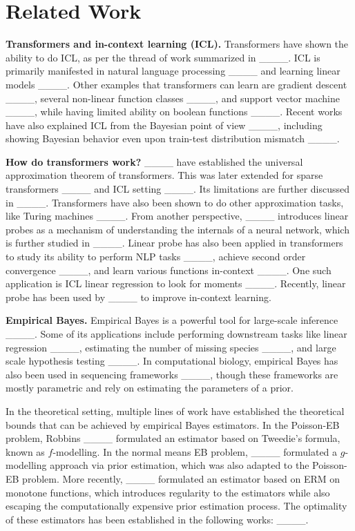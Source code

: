 \section{Related Work}
\textbf{Transformers and in-context learning (ICL). }
Transformers have shown the ability to do ICL, as per the thread of work summarized in 
____. 
ICL is primarily manifested in natural language processing ____ 
and learning linear models ____. 
Other examples that transformers can learn are gradient descent ____, 
several non-linear function classes ____, and support vector machine ____, 
while having limited ability on boolean functions ____. 
Recent works have also explained ICL from the Bayesian point of view 
____, including showing Bayesian behavior even upon train-test distribution mismatch ____. 


\textbf{How do transformers work?} 
____ have established the universal approximation theorem of transformers. 
This was later extended for sparse transformers ____ and ICL setting ____. Its limitations are further discussed in ____. 
Transformers have also been shown to do other approximation tasks, like Turing machines 
____. 
From another perspective, 
____ introduces linear probes as a mechanism of understanding the internals of a neural network, which is further studied in ____. 
Linear probe has also been applied in transformers to study its ability to perform NLP tasks ____, achieve second order convergence ____, and learn various functions in-context ____. 
One such application is ICL linear regression to look for moments ____. 
Recently, linear probe has been used by ____ to improve in-context learning. 

\textbf{Empirical Bayes. }
Empirical Bayes is a powerful tool for large-scale inference ____. 
Some of its applications include performing downstream tasks like linear regression 
____, estimating the number of missing species ____, 
and large scale hypothesis testing ____. 
In computational biology, empirical Bayes has also been used in sequencing frameworks 
____, 
though these frameworks are mostly parametric and rely on estimating the parameters of a prior. 

In the theoretical setting, multiple lines of work have established the theoretical bounds that can be achieved by empirical Bayes estimators. 
In the Poisson-EB problem, Robbins ____ formulated an estimator based on Tweedie's formula, known as $f$-modelling. In the normal means EB problem, ____ formulated a $g$-modelling approach via prior estimation, which was also adapted to the Poisson-EB problem. 
More recently, ____ formulated an estimator based on ERM on monotone functions, 
which introduces regularity to the estimators while also escaping the computationally expensive prior estimation process. 
The optimality of these estimators has been established in the following works: 
____.